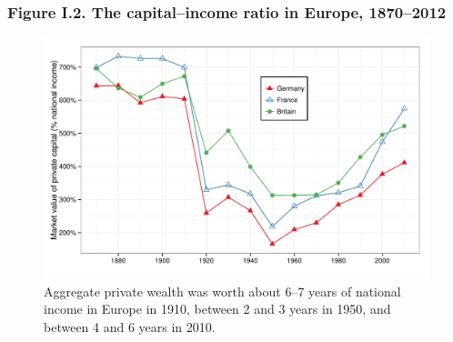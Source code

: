 \documentclass[t]{beamer}\usepackage[]{graphicx}\usepackage[]{color}
\newenvironment{knitrout}{}{} %
\begin{document}
\begin{frame}[label=Figure_0_2,fragile]
\frametitle{Figure I.2. The capital--income ratio in Europe, 1870--2012}
\begin{figure}[t]
\begin{minipage}[b]{\textwidth}
\centering
\begin{knitrout}\footnotesize
{}\color{fgcolor}

{\centering \includegraphics[width=1\linewidth]{figures/color/Figure_0_2} 

}



\end{knitrout}
\caption{Aggregate private wealth was worth about 6--7 years of national income in Europe in 1910, between 2 and 3 years in 1950, and between 4 and 6 years in 2010.}
\end{minipage}
\end{figure}
\end{frame}
\end{document}
